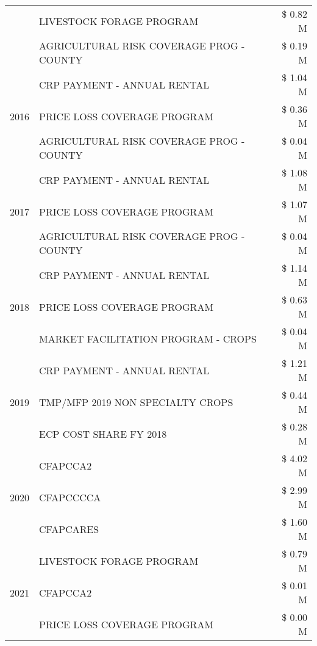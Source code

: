 \begin{tabular}{llr}
 & LIVESTOCK FORAGE PROGRAM & \$ 0.82 M \\
 & AGRICULTURAL RISK COVERAGE PROG - COUNTY & \$ 0.19 M \\
\cline{1-3}
\multirow[t]{3}{*}{2016} & CRP PAYMENT - ANNUAL RENTAL & \$ 1.04 M \\
 & PRICE LOSS COVERAGE PROGRAM & \$ 0.36 M \\
 & AGRICULTURAL RISK COVERAGE PROG - COUNTY & \$ 0.04 M \\
\cline{1-3}
\multirow[t]{3}{*}{2017} & CRP PAYMENT - ANNUAL RENTAL & \$ 1.08 M \\
 & PRICE LOSS COVERAGE PROGRAM & \$ 1.07 M \\
 & AGRICULTURAL RISK COVERAGE PROG - COUNTY & \$ 0.04 M \\
\cline{1-3}
\multirow[t]{3}{*}{2018} & CRP PAYMENT - ANNUAL RENTAL & \$ 1.14 M \\
 & PRICE LOSS COVERAGE PROGRAM & \$ 0.63 M \\
 & MARKET FACILITATION PROGRAM - CROPS & \$ 0.04 M \\
\cline{1-3}
\multirow[t]{3}{*}{2019} & CRP PAYMENT - ANNUAL RENTAL & \$ 1.21 M \\
 & TMP/MFP 2019 NON SPECIALTY CROPS & \$ 0.44 M \\
 & ECP COST SHARE FY 2018 & \$ 0.28 M \\
\cline{1-3}
\multirow[t]{3}{*}{2020} & CFAPCCA2 & \$ 4.02 M \\
 & CFAPCCCCA & \$ 2.99 M \\
 & CFAPCARES & \$ 1.60 M \\
\cline{1-3}
\multirow[t]{3}{*}{2021} & LIVESTOCK FORAGE PROGRAM & \$ 0.79 M \\
 & CFAPCCA2 & \$ 0.01 M \\
 & PRICE LOSS COVERAGE PROGRAM & \$ 0.00 M \\
\cline{1-3}
\bottomrule
\end{tabular}

